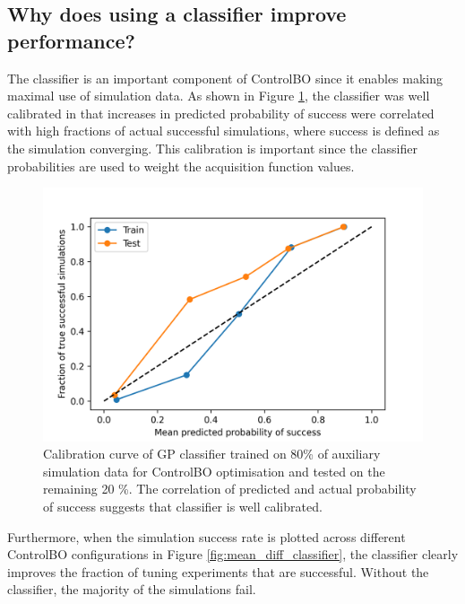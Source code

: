 \subsection{Why does using a classifier improve performance?}

The classifier is an important component of ControlBO since it enables making maximal use of simulation data. As shown in Figure \ref{fig:classifier_calibration}, the classifier was well calibrated in that increases in predicted probability of success were correlated with high fractions of actual successful simulations, where success is defined as the simulation converging. This calibration is important since the classifier probabilities are used to weight the acquisition function values.

\begin{figure}
    \centering
    \includegraphics[width=\textwidth]{gfx/Chapter06/classifier_calibration.png}
    \caption{Calibration curve of GP classifier trained on 80\% of auxiliary simulation data for ControlBO optimisation and tested on the remaining 20 \%. The correlation of predicted and actual probability of success suggests that classifier is well calibrated.}
    \label{fig:classifier_calibration}
\end{figure}

Furthermore, when the simulation success rate is plotted across different ControlBO configurations in Figure \ref{fig:mean_diff_classifier}, the classifier clearly improves the fraction of tuning experiments that are successful. Without the classifier, the majority of the simulations fail.  

